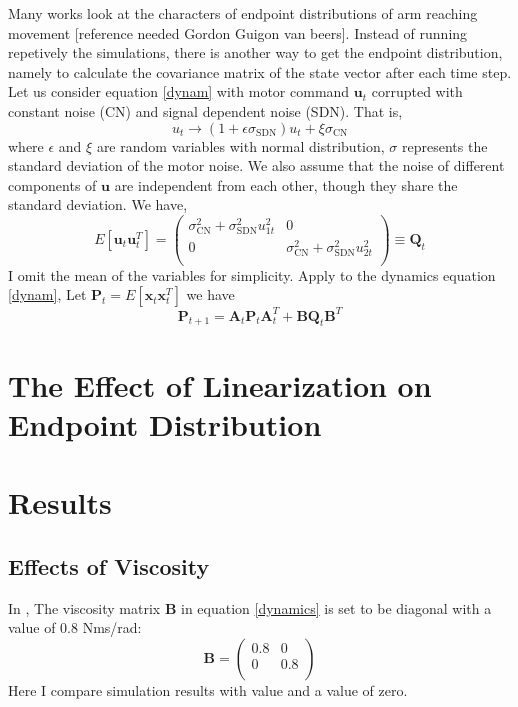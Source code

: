 Many works look at the characters of endpoint distributions of arm reaching movement [reference needed Gordon Guigon van beers]. Instead of running repetively the simulations, there is another way to get the endpoint distribution, namely to calculate the covariance matrix of the state vector after each time step. Let us consider equation \ref{dynam} with motor command $\bm{u}_t$ corrupted with constant noise (CN) and signal dependent noise (SDN). That is,
\begin{equation}
u_t \rightarrow (1 + \epsilon\sigma_{\text{SDN}}) u_t + \xi\sigma_{\text{CN}}
\end{equation}
where $\epsilon$ and $\xi$ are random variables with normal distribution, $\sigma$ represents the standard deviation of the motor noise. We also assume that the noise of different components of $\bm{u}$ are independent from each other, though they share the standard deviation. We have,
\begin{equation}
	E[\bm{u}_t\bm{u}_t^T] = 
	\left(\begin{matrix}
		\sigma_{\text{CN}}^2 + 		\sigma_{\text{SDN}}^2 u_{1t}^2   &  0 \\
		0  &   \sigma_{\text{CN}}^2 + 		\sigma_{\text{SDN}}^2 u_{2t}^2   \\
	\end{matrix}\right)  \equiv \bm{Q}_t
\end{equation}
I omit the mean of the variables for simplicity. Apply to the dynamics equation \ref{dynam}, Let $\bm{P}_t = E[\bm{x}_{t}\bm{x}_{t}^T]$ we have
\begin{equation}
	\bm{P}_{t+1} = \bm{A}_t \bm{P}_t\bm{A}_t^T + \bm{B}\bm{Q}_t\bm{B}^T
\end{equation}

\section{The Effect of Linearization on Endpoint Distribution}

\section{Results}\label{results}
\subsection{Effects of Viscosity}
In \cite{van2004role}, The viscosity matrix $\bm{B}$ in equation \ref{dynamics} is set to be diagonal with a value of 0.8 Nms/rad:
\begin{equation}
	\bm{B} = 
	\left(\begin{matrix}
	0.8 & 0 \\
	0 & 0.8 \\
	\end{matrix}\right)
\end{equation}
Here I compare simulation results with \cite{van2004role} value and a value of zero.

